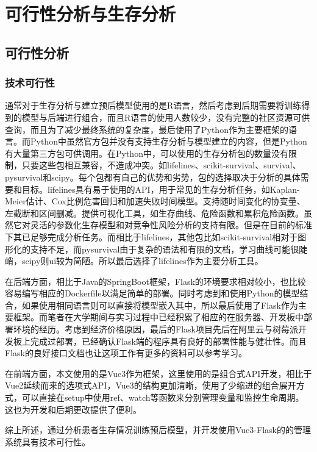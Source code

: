 \chapter{可行性分析与生存分析}
\label{cha:analyse}

\section{可行性分析}

\subsection{技术可行性}

通常对于生存分析与建立预后模型使用的是R语言，然后考虑到后期需要将训练得到的模型与后端进行组合，而且R语言的使用人数较少，没有完整的社区资源可供查询，而且为了减少最终系统的复杂度，最后使用了Python作为主要框架的语言。而Python中虽然官方包并没有支持生存分析与模型建立的内容，但是Python有大量第三方包可供调用。在Python中，可以使用的生存分析包的数量没有限制，只要这些包相互兼容，不造成冲突。如lifelines、scikit-survival、survival、pysurvival和scipy。每个包都有自己的优势和劣势，包的选择取决于分析的具体需要和目标。lifelines具有易于使用的API，用于常见的生存分析任务，如Kaplan-Meier估计、Cox比例危害回归和加速失败时间模型。支持随时间变化的协变量、左截断和区间删减。提供可视化工具，如生存曲线、危险函数和累积危险函数。虽然它对灵活的参数化生存模型和对竞争性风险分析的支持有限。但是在目前的标准下其已足够完成分析任务。而相比于lifelines，其他包比如scikit-survival相对于图形化的支持不足，而pysurvival由于复杂的语法和有限的文档，学习曲线可能很陡峭，scipy则ui较为简陋。所以最后选择了lifelines作为主要分析工具。

在后端方面，相比于Java的SpringBoot框架，Flask的环境要求相对较小，也比较容易编写相应的Dockerfile以满足简单的部署。同时考虑到和使用Python的模型结合，如果使用相同语言则可以直接将模型嵌入其中，所以最后使用了Flask作为主要框架。而笔者在大学期间与实习过程中已经积累了相应的在服务器、开发板中部署环境的经历。考虑到经济价格原因，最后的Flask项目先后在阿里云与树莓派开发板上完成过部署，已经确认Flask端的程序具有良好的部署性能与健壮性。而且Flask的良好接口文档也让这项工作有更多的资料可以参考学习。

在前端方面，本文使用的是Vue3作为框架，这里使用的是组合式API开发，相比于Vue2延续而来的选项式API，Vue3的结构更加清晰，使用了少缩进的组合展开方式，可以直接在setup中使用ref、watch等函数来分别管理变量和监控生命周期。这也为开发和后期更改提供了便利。

综上所述，通过分析患者生存情况训练预后模型，并开发使用Vue3-Flask的的管理系统具有技术可行性。

